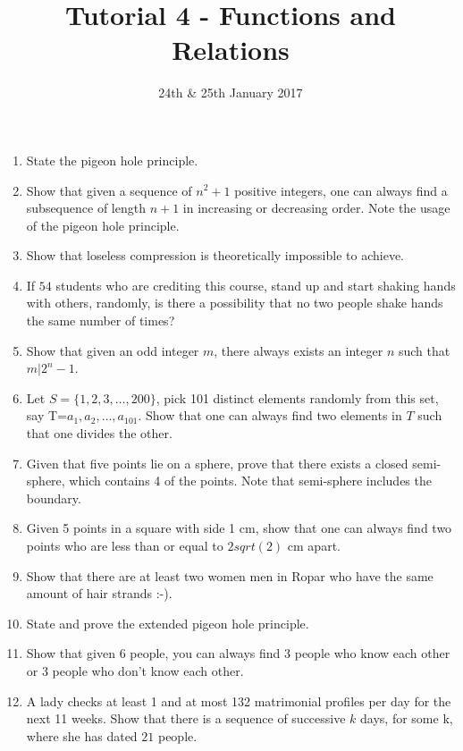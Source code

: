 \documentclass[a4paper]{article}
\title{Tutorial 4 - Functions and Relations}
\date{24th \& 25th January 2017}
\begin{document}
\maketitle
\begin{enumerate}
    \item State the pigeon hole principle.
    \item Show that given a sequence of $n^2+1$ positive integers, one can always find a subsequence of length $n+1$ in increasing or decreasing order. Note the usage of the pigeon hole principle.
    \item Show that loseless compression is theoretically impossible to achieve.
    \item If $54$ students who are crediting this course, stand up and start shaking hands with others, randomly, is there a possibility that no two people shake hands the same number of times?
    \item Show that given an odd integer $m$, there always exists an integer $n$ such that $m|2^n-1$.
    \item Let $S=\{1,2,3,\dots,200\}$, pick 101 distinct elements randomly from this set, say T=${a_1,a_2,\dots,a_101}$. Show that one can always find two elements in $T$ such that one divides the other.
    \item Given that five points lie on a sphere, prove that there exists a closed semi-sphere, which contains 4 of the points. Note that semi-sphere includes the boundary.
    \item Given 5 points in a square with side 1 cm, show that one can always find two points who are less than or equal to $2sqrt(2)$ cm apart. 
    \item Show that there are at least two women men in Ropar who have the same amount of hair strands :-).
    \item State and prove the extended pigeon hole principle. 
    \item Show that given 6 people, you can always find 3 people who know each other or 3 people who don't know each other.
    \item A lady checks at least 1 and at most 132 matrimonial profiles per day for the next 11 weeks. Show that there is a sequence of successive $k$ days, for some k, where she has dated $21$ people.  
\end{enumerate}
\end{document}
